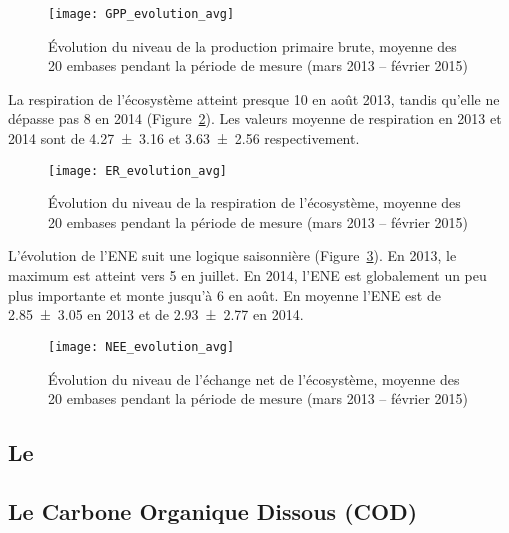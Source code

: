 \begin{figure}
\centering
\texttt{[image: GPP\_evolution\_avg]}
\caption{Évolution du niveau de la production primaire brute, moyenne des 20 embases pendant la période de mesure (mars 2013 -- février 2015)}
\label{fig:GPP_evolution_avg}
\end{figure}


La respiration de l'écosystème atteint presque \SI{10}{\uml} en août 2013, tandis qu'elle ne dépasse pas \SI{8}{\uml} en 2014 (Figure~\ref{fig:ER_evolution_avg}).
Les valeurs moyenne de respiration en 2013 et 2014 sont de \SI{4.27(316)}{\uml} et \SI{3.63(256)}{\uml} respectivement.

\begin{figure}
\centering
\texttt{[image: ER\_evolution\_avg]}
\caption{Évolution du niveau de la respiration de l'écosystème, moyenne des 20 embases pendant la période de mesure (mars 2013 -- février 2015)}
\label{fig:ER_evolution_avg}
\end{figure}


L'évolution de l'ENE suit une logique saisonnière (Figure~\ref{fig:NEE_evolution_avg}).
En 2013, le maximum est atteint vers \SI{5}{\uml} en juillet.
En 2014, l'ENE est globalement un peu plus importante et monte jusqu'à \SI{6}{\uml} en août.
En moyenne l'ENE est de \SI{2.85(305)}{\uml} en 2013 et de \SI{2.93(277)}{\uml} en 2014.

\begin{figure}
\centering
\texttt{[image: NEE\_evolution\_avg]}
\caption{Évolution du niveau de l'échange net de l'écosystème, moyenne des 20 embases pendant la période de mesure (mars 2013 -- février 2015)}
\label{fig:NEE_evolution_avg}
\end{figure}

\subsection{Le \chh}
\subsection{Le Carbone Organique Dissous (COD)}

